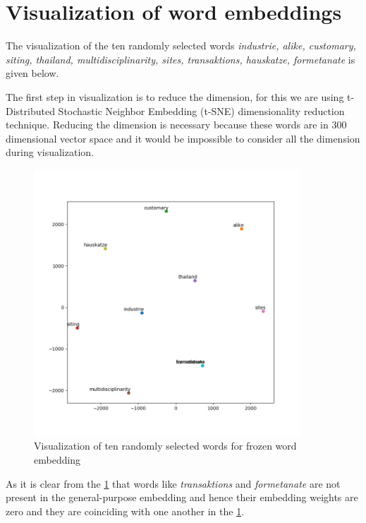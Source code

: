 \section{Visualization of word embeddings} \label{visualEmb}

The visualization of the ten randomly selected words \textit{industrie, alike, customary, siting, thailand, multidisciplinarity, sites, transaktions, hauskatze, formetanate} is given below.

The first step in visualization is to reduce the dimension, for this we are using t-Distributed Stochastic Neighbor Embedding (t-SNE) dimensionality reduction technique. Reducing the dimension is necessary because these words are in 300 dimensional vector space and it would be impossible to consider all the dimension during visualization.

\begin{figure}[!ht]
    \centering
    \includegraphics[width=10cm,height=10cm,keepaspectratio]{pics/before_selected_embedding.png}
    \captionsetup{justification=centering,margin=1cm}
    \caption{Visualization of ten randomly selected words for frozen word embedding}
    \label{fig:frozenAppendix}
\end{figure}

As it is clear from the \ref{fig:frozenAppendix} that words like \textit{transaktions} and \textit{formetanate} are not present in the general-purpose embedding and hence their embedding weights are zero and they are coinciding with one another in the \ref{fig:frozenAppendix}.

